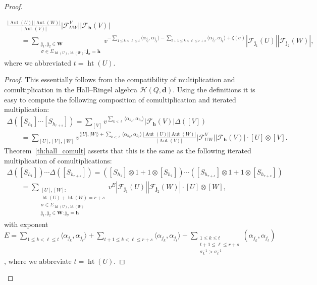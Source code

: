 \begin{proof}
\begin{Lemma}
\begin{gather}
\frac{|\operatorname{Aut}(U)||\operatorname{Aut}(W)|}{|\operatorname{Aut}(V)|}\big|\mathcal{F}^V_{UW}\big||\mathcal{F}_\mathbf{h}(V)|
\\
\qquad
 =\sum\limits_{\substack{\mathbf{j}_1,\mathbf{j}_2\in\mathbf{W}\\
\sigma\in\Sigma_{\operatorname{ht}(U),\operatorname{ht}(W)}: \mathbf{j}_\sigma=\mathbf{h}}}v^{-\sum\limits_{1\le
k<\ell\le t}\langle\alpha_{j_\ell},\alpha_{j_k}\rangle-\sum\limits_{t+1\le k<\ell\le
r+s}\langle\alpha_{j_\ell},\alpha_{j_k}\rangle+\zeta(\sigma)}|\mathcal{F}_{\mathbf{j}_1}(U)||\mathcal{F}_{\mathbf{j}_2}(W)|,
\label{eq:flag_identity}
\end{gather}
where we abbreviated $t=\operatorname{ht}(U)$.
\end{Lemma}

\begin{proof}
This essentially follows from the compatibility of multiplication and comultiplication in the Hall--Ringel algebra
$\mathcal{H}(Q,\mathbf{d})$.
Using the def\/initions it is easy to compute the following composition of comultiplication and iterated multiplication:
\begin{gather*}
\Delta([S_{h_1}]\cdots[S_{h_{r+s}}])=\sum\limits_{[V]}v^{\sum\limits_{k<\ell}\langle
\alpha_{h_k},\alpha_{h_\ell}\rangle}|\mathcal{F}_\mathbf{h}(V)|\Delta([V])
\\
\qquad
 =\sum\limits_{[U],[V],[W]}v^{\langle|U|,|W|\rangle+\sum\limits_{k<\ell}\langle\alpha_{h_k},\alpha_{h_\ell}\rangle}
\frac{|\operatorname{Aut}(U)||\operatorname{Aut}(W)|}{|\operatorname{Aut}(V)|}\big|\mathcal{F}^V_{UW}\big||\mathcal{F}_\mathbf{h}(V)|\cdot[U]\otimes[V].
\end{gather*}
Theorem~\ref{th:hall_comult} asserts that this is the same as the following iterated multiplication of
comultiplications:
\begin{gather*}
\Delta([S_{h_1}])\cdots\Delta([S_{h_{r+s}}])=([S_{h_1}]\otimes1+1\otimes[S_{h_1}])\cdots([S_{h_{r+s}}]\otimes1+1\otimes[S_{h_{r+s}}])
\\
\qquad
 =\sum\limits_{\substack{[U],[W]:\\ \operatorname{ht}(U)+\operatorname{ht}(W)=r+s\\
\sigma\in\Sigma_{\operatorname{ht}(U),\operatorname{ht}(W)}\\
\mathbf{j}_1,\mathbf{j}_2\in\mathbf{W}: \mathbf{j}_\sigma=\mathbf{h}}}v^E
|\mathcal{F}_{\mathbf{j}_1}(U)||\mathcal{F}_{\mathbf{j}_2}(W)|\cdot [U]\otimes[W],
\end{gather*}
with exponent $E=\sum\limits_{1\le k<\ell\le t}\langle\alpha_{j_k},\alpha_{j_\ell}\rangle
+\sum\limits_{t+1\le k<\ell\le r+s}\langle\alpha_{j_k},\alpha_{j_\ell}\rangle
+\sum\limits_{\substack{1\le k\le t\\t+1\le\ell\le r+s\\\sigma_k^{-1}>\sigma_\ell^{-1}}}(\alpha_{j_k},\alpha_{j_\ell})$,
where we abbreviate $t=\operatorname{ht}(U)$.


\end{proof}
\end{proof}
